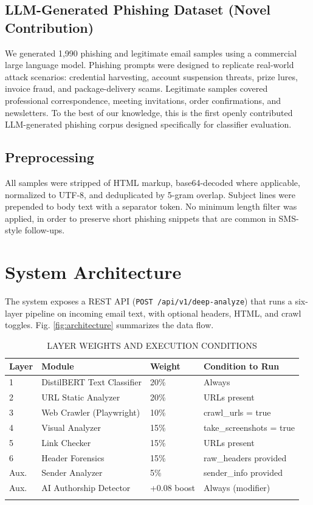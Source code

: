\documentclass[pdflatex,sn-mathphys-num]{sn-jnl}
\begin{document}
\subsection{LLM-Generated Phishing Dataset (Novel Contribution)}
We generated 1,990 phishing and legitimate email samples using a commercial large language model. Phishing prompts were designed to replicate real-world attack scenarios: credential harvesting, account suspension threats, prize lures, invoice fraud, and package-delivery scams. Legitimate samples covered professional correspondence, meeting invitations, order confirmations, and newsletters. To the best of our knowledge, this is the first openly contributed LLM-generated phishing corpus designed specifically for classifier evaluation.

\subsection{Preprocessing}
All samples were stripped of HTML markup, base64-decoded where applicable, normalized to UTF-8, and deduplicated by 5-gram overlap. Subject lines were prepended to body text with a separator token. No minimum length filter was applied, in order to preserve short phishing snippets that are common in SMS-style follow-ups.

\section{System Architecture}\label{sec:system_architecture}

The system exposes a REST API (\texttt{POST /api/v1/deep-analyze}) that runs a six-layer pipeline on incoming email text, with optional headers, HTML, and crawl toggles. Fig. \ref{fig:architecture} summarizes the data flow.

\begin{table}[h]
\caption{LAYER WEIGHTS AND EXECUTION CONDITIONS}\label{tab:layer_weights}
\begin{tabular}{@{}llll@{}}
\toprule
Layer & Module & Weight & Condition to Run \\
\midrule
1 & DistilBERT Text Classifier & 20\% & Always \\
2 & URL Static Analyzer & 20\% & URLs present \\
3 & Web Crawler (Playwright) & 10\% & crawl\_urls = true \\
4 & Visual Analyzer & 15\% & take\_screenshots = true \\
5 & Link Checker & 15\% & URLs present \\
6 & Header Forensics & 15\% & raw\_headers provided \\
Aux. & Sender Analyzer & 5\% & sender\_info provided \\
Aux. & AI Authorship Detector & +0.08 boost & Always (modifier) \\
\botrule
\end{tabular}
\end{table}
\end{document}
